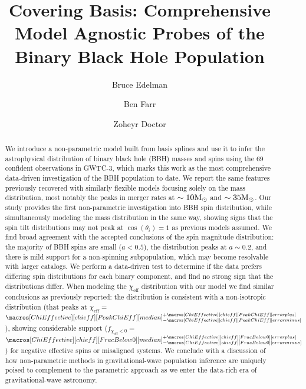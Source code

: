 \documentclass[twocolumn, linenumbers]{aastex631}
\newcommand{\msun}{\ensuremath{{\rm M}_\odot}}
\newcommand{\result}[1]{\textcolor{red}{#1}}
\newcommand{\CIPlusMinus}[1]{{#1[median]^{+#1[error plus]}_{-#1[error minus]}}}
\begin{document}
\title{Covering Basis: Comprehensive Model Agnostic Probes of the Binary Black Hole Population}

\author{Bruce Edelman}
\author{Ben Farr}
\author{Zoheyr Doctor}


\begin{abstract}                 
We introduce a non-parametric model built from basis splines and use it to infer the astrophysical distribution of 
binary black hole (BBH) masses and spins using the 69 confident observations in GWTC-3, which marks this work as 
the most comprehensive data-driven investigation of the BBH population to date. We report the same features previously recovered 
with similarly flexible models focusing solely on the mass distribution, most notably the peaks in merger rates at $\sim10\msun$ and $\sim35\msun$. 
Our study provides the first non-parametric investigation into BBH spin distribution, while simultaneously modeling the mass distribution in the same way, 
showing signs that the spin tilt distributions may not peak at $\cos(\theta_i) = 1$ as previous models assumed. We find broad agreement with the 
accepted conclusions of the spin magnitude distribution: the majority of BBH spins are small ($a<0.5$), the distribution peaks at $a\sim0.2$, 
and there is mild support for a non-spinning subpopulation, which may become resolvable with larger catalogs. 
We perform a data-driven test to determine if the data prefers differing spin distributions for each binary component, and 
find no strong sign that the distributions differ. When modeling the $\chi_\mathrm{eff}$ distribution with our model we find similar 
conclusions as previously reported: the distribution is consistent with a non-isotropic distribution (that peaks at $\chi_\mathrm{eff}=\,$\result{$\CIPlusMinus{\macros[ChiEffective][chieff][PeakChiEff]}$}), 
showing considerable support ($f_{\chi_\mathrm{eff}<0}=\,$\result{$\CIPlusMinus{\macros[ChiEffective][chieff][FracBelow0]}$}) for negative effective spins or misaligned systems.
We conclude with a discussion of how non-parametric methods in gravitational-wave population inference are uniquely poised to complement to 
the parametric approach as we enter the data-rich era of gravitational-wave astronomy.
\end{abstract}
\end{document}
